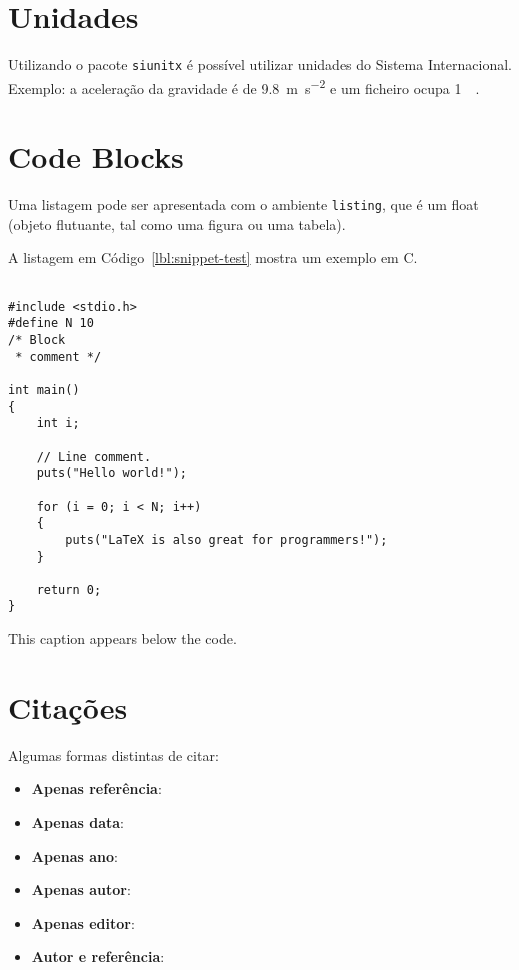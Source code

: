 \section{Unidades}

Utilizando o pacote \verb|siunitx| é possível utilizar unidades do Sistema Internacional. Exemplo: a aceleração da gravidade é de \SI{9.8}{\metre\per\second\squared} e um ficheiro ocupa \SI{1}{\mebi\byte}. 

\section{Code Blocks}
Uma listagem pode ser apresentada com o ambiente \texttt{listing}, que é um float (objeto flutuante, tal como uma figura ou uma tabela).

A listagem em Código~\ref{lbl:snippet-test} mostra um exemplo em C.

\begin{listing}[h]
\begin{verbatim}

#include <stdio.h>
#define N 10
/* Block
 * comment */
 
int main()
{
    int i;
 
    // Line comment.
    puts("Hello world!");
 
    for (i = 0; i < N; i++)
    {
        puts("LaTeX is also great for programmers!");
    }
 
    return 0;
}
\end{verbatim}
\caption{This caption appears below the code.}
\label{lbl:snippet-test}
\end{listing}


\section{Citações}

Algumas formas distintas de citar:

\begin{itemize}
    \item \textbf{Apenas referência}:~\cite{rfc44}
    \item \textbf{Apenas data}:~
    \item \textbf{Apenas ano}:~\citeyear{rfc44}
    \item \textbf{Apenas autor}:~\citeauthor{rfc44}
    \item \textbf{Apenas editor}:
    \item \textbf{Autor e referência}:\citet{rfc44}
\end{itemize}
